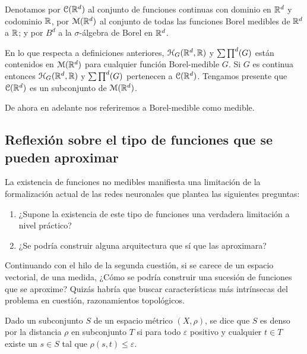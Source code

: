Denotamos por  $\mathcal{C}(\mathbb{R}^d)$ al conjunto de funciones continuas con dominio en $\mathbb{R}^d$ y codominio $\mathbb{R}$,
por  $\mathcal{M}(\mathbb{R}^d)$ al conjunto de todas las funciones Borel medibles de $\mathbb{R}^d$ a $\mathbb{R}$; 
y por $B^d$ a la $\sigma$-álgebra de Borel en $\mathbb{R} ^d$. 

En lo que respecta a definiciones anteriores, $\mathcal{H}_G(\mathbb{R}^d,\mathbb{R})$ y $\sum \prod^d (G)$ están contenidos en
$\mathcal{M}(\mathbb{R}^d)$ para cualquier función Borel-medible $G$. Si $G$ es continua entonces 
$\mathcal{H}_G(\mathbb{R}^d,\mathbb{R})$ y $\sum \prod^d (G)$ pertenecen a $\mathcal{C}(\mathbb{R}^d)$. Tengamos presente que $\mathcal{C}(\mathbb{R}^d)$ es un subconjunto
de $\mathcal{M}(\mathbb{R}^d)$.  

De ahora en adelante nos referiremos a Borel-medible como medible. 
  

\subsection{ Reflexión sobre el tipo de funciones que se pueden aproximar}

La existencia de funciones no medibles manifiesta una limitación
de la formalización actual de las redes neuronales que plantea las siguientes 
preguntas: 
\begin{enumerate}
    \item ¿Supone la existencia de este tipo de funciones una verdadera limitación a nivel práctico?
    \item ¿Se podría construir alguna arquitectura que sí que las aproximara?
\end{enumerate}  

Continuando con el hilo de la segunda cuestión, si se carece de un espacio vectorial, 
de una medida,  ¿Cómo se podría construir una sucesión de funciones que se aproxime?
Quizás habría que buscar características más intrínsecas del problema en cuestión, 
razonamientos topológicos.

\begin{definicion} 

    Dado un subconjunto $S$ de un espacio métrico $(X, \rho)$, se dice que $S$ es denso por la distancia $\rho$
    en subconjunto $T$ si para todo $\varepsilon$ positivo y cualquier $t \in T$ existe un $s \in S$ tal 
    que $\rho(s,t) \leq \varepsilon$. 
\end{definicion}

